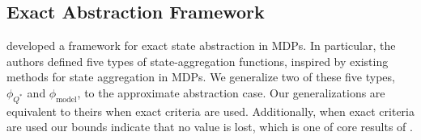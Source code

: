\subsection{Exact Abstraction Framework}

\citet{li2006towards} developed a framework for exact state abstraction in \acp{MDP}. In particular, the authors defined five types of state-aggregation functions, inspired by existing methods for state aggregation in \acp{MDP}. We generalize two of these five types, $\phi_{Q^*}$ and $\phi_{\text{model}}$, to the approximate abstraction case. Our generalizations are equivalent to theirs when exact criteria are used. Additionally, when exact criteria are used our bounds indicate that no value is lost, which is one of core results of \citet{li2006towards}.

